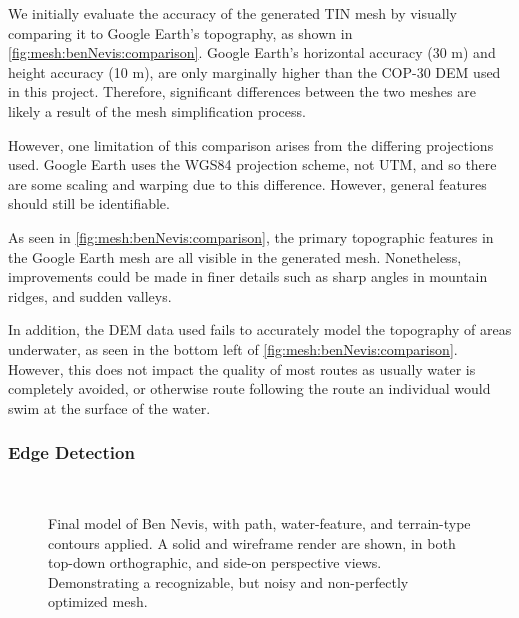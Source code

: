 \documentclass[12pt]{article}
\begin{document}
We initially evaluate the accuracy of the generated TIN mesh by visually comparing it to Google Earth's topography, as shown in \autoref{fig:mesh:benNevis:comparison}. Google Earth's horizontal accuracy (30 m) and height accuracy (10 m), are only marginally higher than the COP-30 DEM used in this project. Therefore, significant differences between the two meshes are likely a result of the mesh simplification process.

However, one limitation of this comparison arises from the differing projections used. Google Earth uses the WGS84 projection scheme, not UTM, and so there are some scaling and warping due to this difference. However, general features should still be identifiable.

As seen in \autoref{fig:mesh:benNevis:comparison}, the primary topographic features in the Google Earth mesh are all visible in the generated mesh. Nonetheless, improvements could be made in finer details such as sharp angles in mountain ridges, and sudden valleys.

In addition, the DEM data used fails to accurately model the topography of areas underwater, as seen in the bottom left of \autoref{fig:mesh:benNevis:comparison}. However, this does not impact the quality of most routes as usually water is completely avoided, or otherwise route following the route an individual would swim at the surface of the water.

\subsubsection{Edge Detection}

\begin{figure}[H]
  \centering
  \\
  \caption{Final model of Ben Nevis, with path, water-feature, and terrain-type contours applied. A solid and wireframe render are shown, in both top-down orthographic, and side-on perspective views. Demonstrating a recognizable, but noisy and non-perfectly optimized mesh.}\label{fig:mesh:benNevis}
\end{figure}
\end{document}
